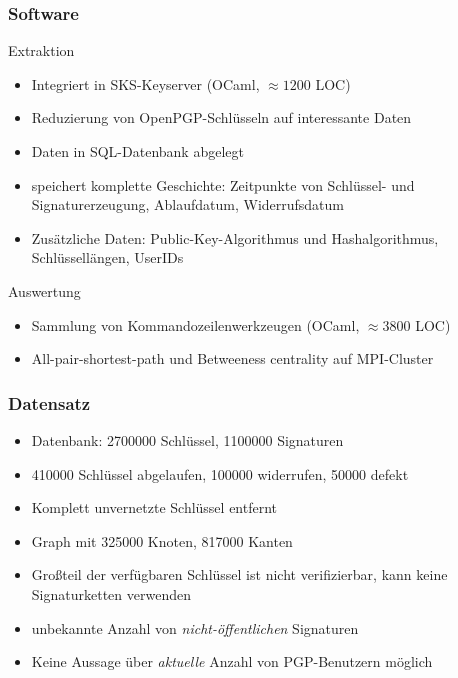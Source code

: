 \documentclass[10pt]{beamer}
\begin{document}
\begin{frame}
  \frametitle{Software}
  Extraktion
  \begin{itemize}
  \item Integriert in SKS-Keyserver (OCaml, $\approx 1200$ LOC)
  \item Reduzierung von OpenPGP-Schl\"usseln auf interessante Daten
  \item Daten in SQL-Datenbank abgelegt
  \item speichert komplette Geschichte: Zeitpunkte von Schl\"ussel-
    und Signaturerzeugung, Ablaufdatum, Widerrufsdatum
  \item Zus\"atzliche Daten: Public-Key-Algorithmus und
    Hashalgorithmus, Schl\"ussell\"angen, UserIDs
  \end{itemize}

Auswertung
\begin{itemize}
\item Sammlung von Kommandozeilenwerkzeugen (OCaml, $\approx 3800$
  LOC)
\item All-pair-shortest-path und Betweeness centrality auf MPI-Cluster
\end{itemize}
\end{frame}

\begin{frame}
  \frametitle{Datensatz}
  \begin{itemize}
  \item Datenbank: 2700000 Schl\"ussel, 1100000 Signaturen
  \item 410000 Schl\"ussel abgelaufen, 100000 widerrufen, 50000 defekt
  \item Komplett unvernetzte Schl\"ussel entfernt
  \item Graph mit 325000 Knoten, 817000 Kanten
  \item Gro{\ss}teil der verf\"ugbaren Schl\"ussel ist nicht
    verifizierbar, kann keine Signaturketten verwenden
  \item unbekannte Anzahl von \emph{nicht-\"offentlichen} Signaturen
  \item Keine Aussage \"uber \emph{aktuelle} Anzahl von PGP-Benutzern
    m\"oglich
  \end{itemize}
\end{frame}
\end{document}
